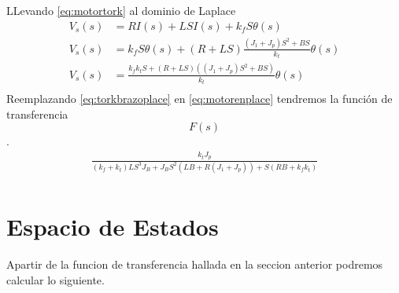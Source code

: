 \documentclass[a4paper]{IEEEtran} %
\begin{document}
LLevando \ref{eq:motortork} al dominio de Laplace 
\begin{equation}
    \begin{split}
        V_{s}(s)&=RI(s)+LSI(s)+k_{f}S\theta(s)\\
        V_{s}(s)&=k_{f}S\theta(s)+(R+LS)\frac{(J_{1}+J_{p})S^2+BS}{k_{t}}\theta(s)\\
        V_{s}(s)&=\frac{k_{f}k_{t}S+(R+LS)((J_{1}+J_{p})S^2+BS)}{k_{t}}\theta(s)\\
    \end{split}
    \label{eq:motorenplace}
\end{equation}
Reemplazando \ref{eq:torkbrazoplace} en \ref{eq:motorenplace} tendremos la función de transferencia$$F(s)$$.
\begin{equation}
    \begin{split}
        \frac{k_{t}J_{p}}{(k_{f}+k_{t})LS^3J_{B}+J_{B}S^2(LB+R(J_{1}+J_{p}))+S(RB+k_{f}k_{t})}\\
    \end{split}
    \label{eq:transfer}
\end{equation}

\section{Espacio de Estados}
Apartir de la funcion de transferencia hallada en la seccion anterior podremos calcular lo siguiente.
\end{document}
